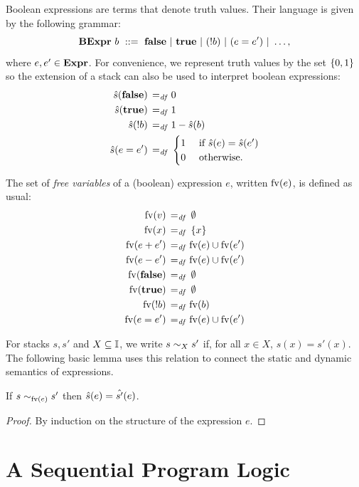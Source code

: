 \documentclass[11pt]{report}
\begin{document}
Boolean expressions are terms that denote truth values. Their language is given by the following grammar: \[ \mathbf{BExpr}~b ~::=~ \mathbf{false} ~|~ \mathbf{true} ~|~ (!b) ~|~ (e = e') ~|~ \ldots, \] where $e,e' \in \mathbf{Expr}$. For convenience, we represent truth values by the set $\left\lbrace 0,1 \right\rbrace$ so the extension of a stack can also be used to interpret boolean expressions: \begin{align*}
    \hat{s}(\mathbf{false}) \operatorname{\;=_{\mathit{df}}\;} & 0 \\
    \hat{s}(\mathbf{true}) \operatorname{\;=_{\mathit{df}}\;} & 1 \\
    \hat{s}(!b) \operatorname{\;=_{\mathit{df}}\;} & 1 - \hat{s}(b) \\
    \hat{s}(e = e') \operatorname{\;=_{\mathit{df}}\;} & \begin{cases}
        1 &\text{ if } \hat{s}(e) = \hat{s}(e')\\
        0 &\text{ otherwise.}
    \end{cases}
\end{align*}

The set of \emph{free variables} of a (boolean) expression $e$, written $\mathrm{fv}(e)$, is defined as usual: \begin{align*}
    \mathrm{fv}(v) \operatorname{\;=_{\mathit{df}}\;} & \operatorname{\emptyset} \\ 
    \mathrm{fv}(x) \operatorname{\;=_{\mathit{df}}\;} & \left\lbrace x \right\rbrace \\ 
    \mathrm{fv}(e + e') \operatorname{\;=_{\mathit{df}}\;} & \mathrm{fv}(e) \cup \mathrm{fv}(e') \\ 
    \mathrm{fv}(e - e') \operatorname{\;=_{\mathit{df}}\;} & \mathrm{fv}(e) \cup \mathrm{fv}(e') \\ 
    \mathrm{fv}(\mathbf{false}) \operatorname{\;=_{\mathit{df}}\;} & \operatorname{\emptyset} \\ 
    \mathrm{fv}(\mathbf{true}) \operatorname{\;=_{\mathit{df}}\;} & \operatorname{\emptyset} \\ 
    \mathrm{fv}(!b) \operatorname{\;=_{\mathit{df}}\;} & \mathrm{fv}(b) \\ 
    \mathrm{fv}(e = e') \operatorname{\;=_{\mathit{df}}\;} & \mathrm{fv}(e) \cup \mathrm{fv}(e')
\end{align*}

For stacks $s,s'$ and $X \subseteq \mathbb{I}$, we write $s \sim_{X} s'$ if, for all $x \in X$, $s(x) = s'(x)$. The following basic lemma uses this relation to connect the static and dynamic semantics of expressions. 
\begin{lemma}
\label{lem:exp-stcong}
    If $s \sim_{\mathrm{fv}(e)} s'$ then $\hat{s}(e) = \hat{s'}(e)$. 
\end{lemma}

\begin{proof}
By induction on the structure of the expression $e$. 
\end{proof}

\chapter{A Sequential Program Logic}
\label{ch:uniprocessor}
\end{document}
